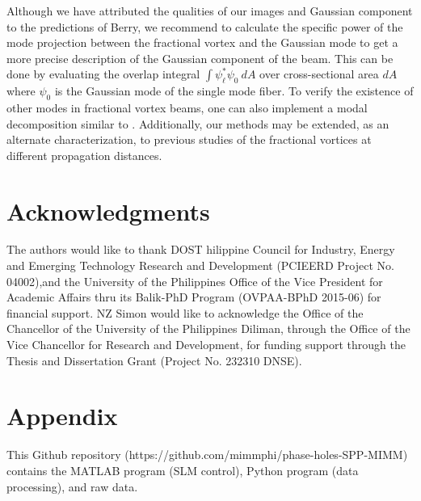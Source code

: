 \documentclass[10pt,a4paper,twoside]{article}
\renewcommand{\l}{\ell}
\begin{document}
Although we have attributed the qualities of our images and Gaussian component to the predictions of Berry, we recommend to calculate the specific power of the mode projection between the fractional vortex and the Gaussian mode to get a more precise description of the Gaussian component of the beam. This can be done by evaluating the overlap integral $\int \psi_{\l}^* \psi_{0}~dA$ over cross-sectional area $dA$ where $\psi_0$ is the Gaussian mode of the single mode fiber. To verify the existence of other modes in fractional vortex beams, one can also implement a modal decomposition similar to \cite{vasnetsov2005analysis}. Additionally, our methods may be extended, as an alternate characterization, to previous studies \cite{fiber-struc} of the fractional vortices at different propagation distances.




\section*{Acknowledgments}
The authors would like to thank DOST hilippine Council for Industry, Energy and Emerging Technology Research and Development (PCIEERD Project No. 04002),and the 
University of the Philippines Office of the Vice President for Academic Affairs thru its Balik-PhD Program (OVPAA-BPhD 2015-06) for financial support. NZ Simon would like to acknowledge the Office of the Chancellor of the University of the Philippines Diliman, through the Office of the Vice Chancellor for Research and Development, for funding support through the Thesis and Dissertation Grant (Project No. 232310 DNSE).





\section*{Appendix}

This Github repository (https://github.com/mimmphi/phase-holes-SPP-MIMM) contains the MATLAB program (SLM control), Python program (data processing), and raw data.
\end{document}
